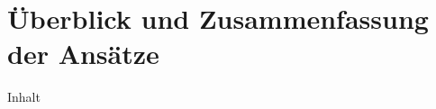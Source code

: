 \section{Überblick und Zusammenfassung der Ansätze}
\label{sec:03-06_overview-and-summary-of-approaches}

Inhalt
